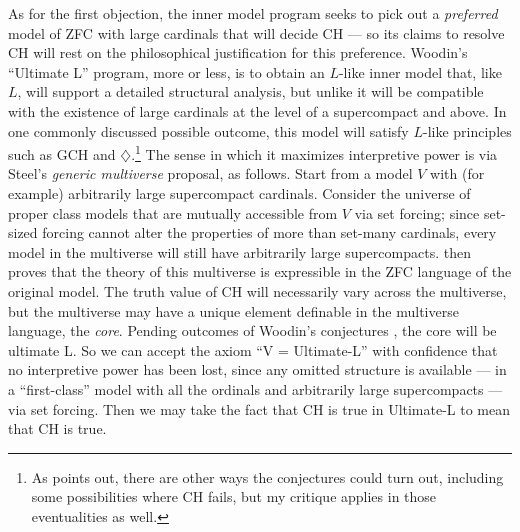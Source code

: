 \documentclass[letterpaper,12pt]{article}
\begin{document}
As for the first objection, the inner model program seeks to pick out a \emph{preferred} model of ZFC with large cardinals that will decide CH --- so its claims to resolve CH will rest on the philosophical justification for this preference. Woodin's ``Ultimate L'' program, more or less, is to obtain an $L$-like inner model that, like $L$, will support a detailed structural analysis, but unlike it will be compatible with the existence of large cardinals at the level of a supercompact and above. In one commonly discussed possible outcome, this model will satisfy $L$-like principles such as GCH and $\diamondsuit$.\footnote{As \cite{sep-continuum-hypothesis} points out, there are other ways the conjectures could turn out, including some possibilities where CH fails, but my critique applies in those eventualities as well.} The sense in which it maximizes interpretive power is via Steel's \emph{generic multiverse} proposal, as follows. Start from a model $V$ with (for example) arbitrarily large supercompact cardinals. Consider the universe of proper class models that are mutually accessible from $V$ via set forcing; since set-sized forcing cannot alter the properties of more than set-many cardinals, every model in the multiverse will still have arbitrarily large supercompacts. \cite{steel2012godel} then proves that the theory of this multiverse is expressible in the ZFC language of the original model. The truth value of CH will necessarily vary across the multiverse, but the multiverse may have a unique element definable in the multiverse language, the \emph{core}. Pending outcomes of Woodin's conjectures \citep{woodin2011suitable}, the core will be ultimate L. So we can accept the axiom ``V = Ultimate-L'' with confidence that no interpretive power has been lost, since any omitted structure is available --- in a ``first-class'' model with all the ordinals and arbitrarily large supercompacts --- via set forcing. Then we may take the fact that CH is true in Ultimate-L to mean that CH is true.
\end{document}
